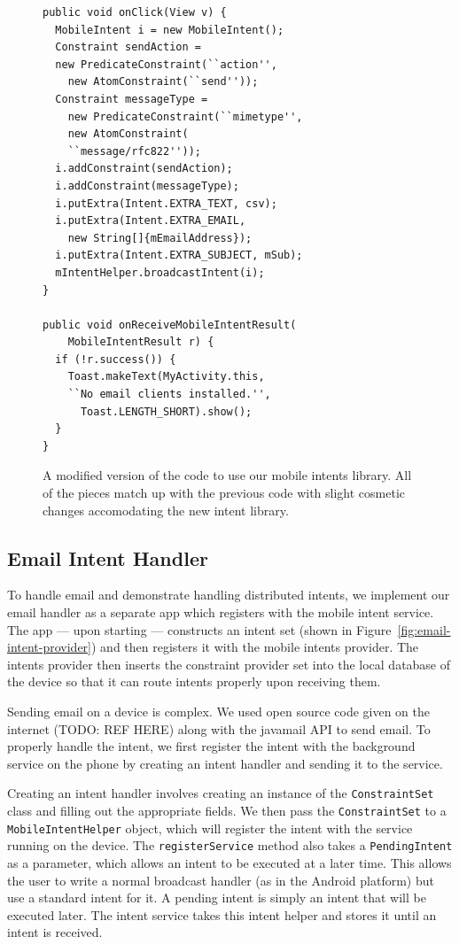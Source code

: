\documentclass{acm_proc_article-sp}
\begin{document}
\begin{figure}[t]  
  \begin{lstlisting}
public void onClick(View v) {
  MobileIntent i = new MobileIntent();
  Constraint sendAction = 
  new PredicateConstraint(``action'', 
    new AtomConstraint(``send''));
  Constraint messageType = 
    new PredicateConstraint(``mimetype'', 
    new AtomConstraint(
    ``message/rfc822''));
  i.addConstraint(sendAction);
  i.addConstraint(messageType);
  i.putExtra(Intent.EXTRA_TEXT, csv);
  i.putExtra(Intent.EXTRA_EMAIL,
    new String[]{mEmailAddress});
  i.putExtra(Intent.EXTRA_SUBJECT, mSub);
  mIntentHelper.broadcastIntent(i);
}

public void onReceiveMobileIntentResult(
    MobileIntentResult r) {
  if (!r.success()) {
    Toast.makeText(MyActivity.this,
    ``No email clients installed.'',
      Toast.LENGTH_SHORT).show();
  }
}
\end{lstlisting}
\caption{A modified version of the code to use our mobile intents
  library.  All of the pieces match up with the previous code with
  slight cosmetic changes accomodating the new intent library.}
\label{fig:mobile-intents-email-example}
\end{figure}

\subsection{Email Intent Handler}

To handle email and demonstrate handling distributed intents, we
implement our email handler as a separate app which registers with the
mobile intent service.  The app --- upon starting --- constructs an
intent set (shown in Figure~\ref{fig:email-intent-provider}) and then
registers it with the mobile intents provider.  The intents provider
then inserts the constraint provider set into the local database of
the device so that it can route intents properly upon receiving them.

Sending email on a device is complex.  We used open source code given
on the internet (TODO: REF HERE) along with the javamail API to send
email.  To properly handle the intent, we first register the intent
with the background service on the phone by creating an intent handler
and sending it to the service.

Creating an intent handler involves creating an instance of the
\texttt{ConstraintSet} class and filling out the appropriate fields.
We then pass the \texttt{ConstraintSet} to a
\texttt{MobileIntentHelper} object, which will register the intent
with the service running on the device.  The \texttt{registerService}
method also takes a \texttt{PendingIntent} as a parameter, which
allows an intent to be executed at a later time.  This allows the user
to write a normal broadcast handler (as in the Android platform) but
use a standard intent for it.  A pending intent is simply an intent
that will be executed later.  The intent service takes this intent
helper and stores it until an intent is received.
\end{document}
